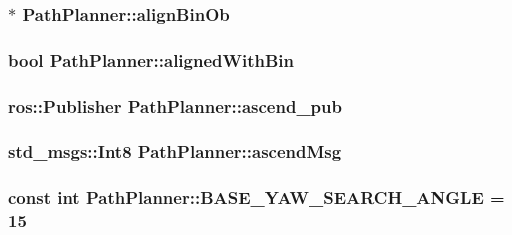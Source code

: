 \subsubsection[{\texorpdfstring{align\+Bin\+Ob}{alignBinOb}}]{$\ast$ Path\+Planner\+::align\+Bin\+Ob}\hypertarget{classPathPlanner_a2953c40a460f99cf2b767b5ab5cb7f3e}{}\label{classPathPlanner_a2953c40a460f99cf2b767b5ab5cb7f3e}
\subsubsection[{\texorpdfstring{aligned\+With\+Bin}{alignedWithBin}}]{\setlength{\rightskip}{0pt plus 5cm}bool Path\+Planner\+::aligned\+With\+Bin}\hypertarget{classPathPlanner_a61566d814449039efd5feaec4ebd217a}{}\label{classPathPlanner_a61566d814449039efd5feaec4ebd217a}
\subsubsection[{\texorpdfstring{ascend\+\_\+pub}{ascend_pub}}]{\setlength{\rightskip}{0pt plus 5cm}ros\+::\+Publisher Path\+Planner\+::ascend\+\_\+pub}\hypertarget{classPathPlanner_a8afd938d26553fae883bd02ed0d44458}{}\label{classPathPlanner_a8afd938d26553fae883bd02ed0d44458}
\subsubsection[{\texorpdfstring{ascend\+Msg}{ascendMsg}}]{\setlength{\rightskip}{0pt plus 5cm}std\+\_\+msgs\+::\+Int8 Path\+Planner\+::ascend\+Msg}\hypertarget{classPathPlanner_a5abd76dde4ea570d1f558336ac13f3e4}{}\label{classPathPlanner_a5abd76dde4ea570d1f558336ac13f3e4}
\subsubsection[{\texorpdfstring{B\+A\+S\+E\+\_\+\+Y\+A\+W\+\_\+\+S\+E\+A\+R\+C\+H\+\_\+\+A\+N\+G\+LE}{BASE_YAW_SEARCH_ANGLE}}]{\setlength{\rightskip}{0pt plus 5cm}const int Path\+Planner\+::\+B\+A\+S\+E\+\_\+\+Y\+A\+W\+\_\+\+S\+E\+A\+R\+C\+H\+\_\+\+A\+N\+G\+LE = 15}\hypertarget{classPathPlanner_a683836da96618f1a2d6e153ef74e55a8}{}\label{classPathPlanner_a683836da96618f1a2d6e153ef74e55a8}
